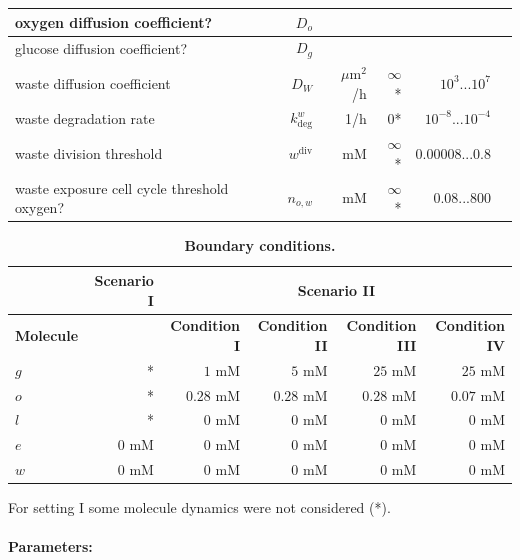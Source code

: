 \documentclass[10pt,letterpaper]{article}
\begin{document}
\begin{table}[!ht]
\begin{adjustwidth}{-1in}{0in}
\begin{tabular}{|l|r|r|r|r|r|}
{\color{green}oxygen diffusion coefficient?} 			&$D_o$&  &  &  \\ \hline
{\color{green}glucose diffusion coefficient?} 			&$D_g$&  &  &  \\ \hline
waste diffusion coefficient 			&$D_W$& $\mu$m$^{2}$/h&$\infty$*& $10^{3}...10^{7}$\\ \hline
waste degradation rate					& $k^w_{\text{deg}}$ &1/h &$0$*& $10^{-8}...10^{-4}$\\ \hline
waste division threshold 			&$w^{\text{div}}$ &{\color{green}mM} &$\infty$*&0.00008...0.8\\ \hline
waste exposure cell cycle threshold {\color{green}oxygen?} 	&$n_{o,w}$&{\color{green}mM}& $\infty$*& 0.08...800\\ \hline
\end{tabular}
\label{tab:model-parameters}
\end{adjustwidth}
\end{table}

\begin{table}[!ht]
\begin{adjustwidth}{-0.5in}{0in} %
\caption{
{\bf Boundary conditions.}}
\begin{tabular}{|l |r |r|r|r|r|}
\hline
 			& {\bf Scenario I} & \multicolumn{4}{|c|}{\bf Scenario II}\\ \hline
{\bf Molecule} 	&				&{\bf Condition I} 	&{\bf Condition II} 	&{\bf Condition III} 	&{\bf Condition IV}\\ \hline
$g$			& * 				& $1$ mM			& $5$ mM			& $25$ mM			&$25$ mM\\ \hline
$o$			& *				& $0.28$ mM		& $0.28$ mM		& $0.28$ mM			&$0.07$ mM\\ \hline
$l$				& *				& $0$ mM			& $0$ mM			& $0$ mM				& $0$ mM\\ \hline
$e$			& $0$ mM		& $0$ mM			& $0$ mM			& $0$ mM				& $0$ mM\\ \hline
$w$			& $0$ mM		& $0$ mM			& $0$ mM			& $0$ mM				& $0$ mM\\ \hline
\end{tabular}
For setting I some molecule dynamics were not considered (*).
\label{tab:boundary conditions}
\end{adjustwidth}
\end{table}


\paragraph{Parameters:} 
\end{document}
